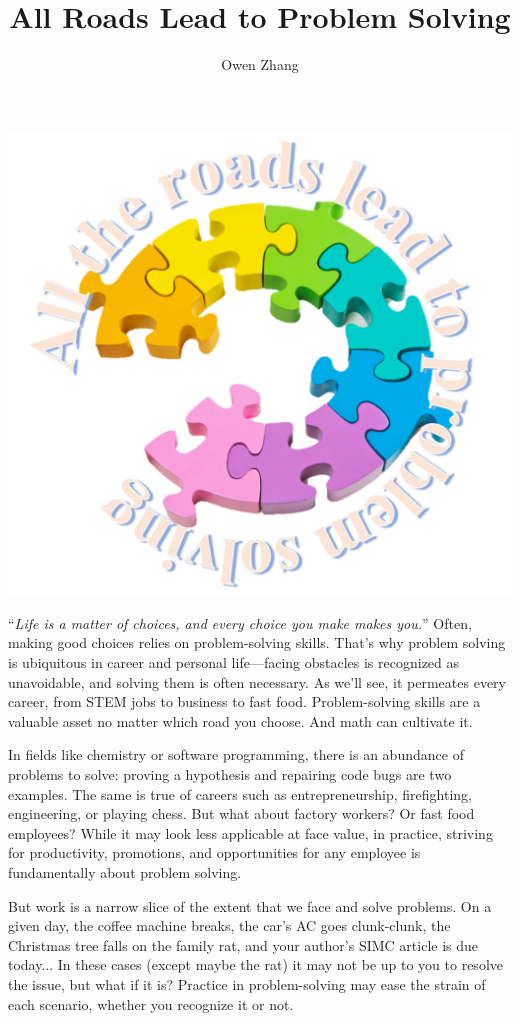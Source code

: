\documentclass{article}
\title{All Roads Lead to Problem Solving}
\author{Owen Zhang}
\begin{document}
\maketitle
\begin{center}
    \includegraphics[scale = 0.2]{images/allroads1.png}
\end{center}

“\textit{Life is a matter of choices, and every choice you make makes you.}” Often, making good choices relies on problem-solving skills. That’s why problem solving is ubiquitous in career and personal life—facing obstacles is recognized as unavoidable, and solving them is often necessary. As we’ll see, it permeates every career, from STEM jobs to business to fast food. Problem-solving skills are a valuable asset no matter which road you choose. And math can cultivate it.

In fields like chemistry or software programming, there is an abundance of problems to solve: proving a hypothesis and repairing code bugs are two examples. The same is true of careers such as entrepreneurship, firefighting, engineering, or playing chess. But what about factory workers? Or fast food employees? While it may look less applicable at face value, in practice, striving for productivity, promotions, and opportunities for any employee is fundamentally about problem solving. 

But work is a narrow slice of the extent that we face and solve problems. On a given day, the coffee machine breaks, the car’s AC goes clunk-clunk, the Christmas tree falls on the family rat, and your author’s SIMC article is due today... In these cases (except maybe the rat) it may not be up to you to resolve the issue, but what if it is? Practice in problem-solving may ease the strain of each scenario, whether you recognize it or not.
\end{document}
